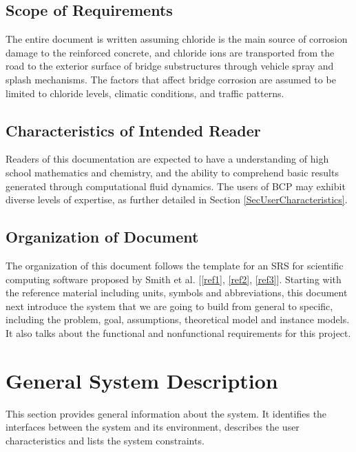 \documentclass[12pt]{article}
\newcommand{\reref}[1]{\ref{#1}}
\begin{document}
\subsection{Scope of Requirements} 
The entire document is written assuming chloride is the main source of corrosion damage to the reinforced concrete, and chloride ions are transported from the road to the exterior surface of bridge substructures through vehicle spray and splash mechanisms. The factors that affect bridge corrosion are assumed to be limited to chloride levels, climatic conditions, and traffic patterns. %

\subsection{Characteristics of Intended Reader} \label{sec_IntendedReader}
Readers of this documentation are expected to have a understanding of high school mathematics and chemistry, and the ability to comprehend basic results generated through computational fluid dynamics. The users of BCP may exhibit diverse levels of expertise, as further detailed in Section \ref{SecUserCharacteristics}.

\subsection{Organization of Document}
The organization of this document follows the template for an SRS for scientific computing software proposed by Smith et al. [\reref{ref1}, \reref{ref2}, \reref{ref3}]. Starting with the reference material including units, symbols and abbreviations, this document next introduce the system that we are going to build from general to specific, including the problem, goal, assumptions, theoretical model and instance models. It also talks about the functional and nonfunctional requirements for this project.

\section{General System Description}

This section provides general information about the system.  It identifies the
interfaces between the system and its environment, describes the user
characteristics and lists the system constraints.  
\end{document}
